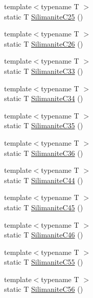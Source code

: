 \begin{DoxyCompactItemize}
\item 
{\footnotesize template$<$typename T $>$ }\\static T \mbox{\hyperlink{namespacempc_1_1data_a45e64631c39ec67b27879cc7e0498912}{Silimanite\+C25}} ()
\item 
{\footnotesize template$<$typename T $>$ }\\static T \mbox{\hyperlink{namespacempc_1_1data_a26a2a33a4f00fc1d351a6591eeee04ef}{Silimanite\+C26}} ()
\item 
{\footnotesize template$<$typename T $>$ }\\static T \mbox{\hyperlink{namespacempc_1_1data_a2467b74042cd194a6ca6297fec1939bd}{Silimanite\+C33}} ()
\item 
{\footnotesize template$<$typename T $>$ }\\static T \mbox{\hyperlink{namespacempc_1_1data_a021af61b9cf14c88f1ae44435edf75a4}{Silimanite\+C34}} ()
\item 
{\footnotesize template$<$typename T $>$ }\\static T \mbox{\hyperlink{namespacempc_1_1data_a2f3aa9df26c1a8228a84731f018c5f5e}{Silimanite\+C35}} ()
\item 
{\footnotesize template$<$typename T $>$ }\\static T \mbox{\hyperlink{namespacempc_1_1data_a70225c66a37f2a35f044f6e785951c5a}{Silimanite\+C36}} ()
\item 
{\footnotesize template$<$typename T $>$ }\\static T \mbox{\hyperlink{namespacempc_1_1data_ab7cf58f8974b6bc804a264f1cfd08d94}{Silimanite\+C44}} ()
\item 
{\footnotesize template$<$typename T $>$ }\\static T \mbox{\hyperlink{namespacempc_1_1data_a40198fd3de61005310799aee63c38616}{Silimanite\+C45}} ()
\item 
{\footnotesize template$<$typename T $>$ }\\static T \mbox{\hyperlink{namespacempc_1_1data_a857d400c5c5f9baa73869447cc67ff3e}{Silimanite\+C46}} ()
\item 
{\footnotesize template$<$typename T $>$ }\\static T \mbox{\hyperlink{namespacempc_1_1data_a0a67fbd28a4e06e24278ceb0f1762e27}{Silimanite\+C55}} ()
\item 
{\footnotesize template$<$typename T $>$ }\\static T \mbox{\hyperlink{namespacempc_1_1data_aa35268644c996699ceadd796c39e8b57}{Silimanite\+C56}} ()
\item 

\end{DoxyCompactItemize}
